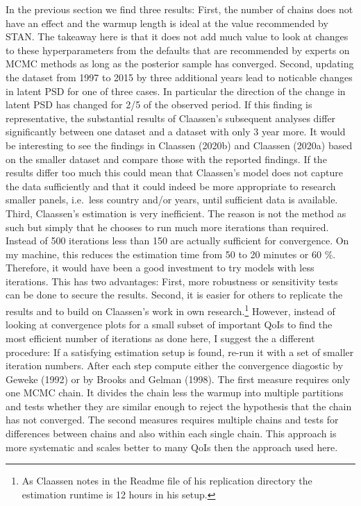 \documentclass[12pt,english,a4paper,oneside]{article}
\theoremstyle{definition}
\theoremstyle{definition}
\theoremstyle{definition}
\theoremstyle{definition}
\theoremstyle{remark}
\begin{document}
In the previous section we find three results: First, the number of chains does not have an effect and the warmup length is ideal at the value recommended by STAN. The takeaway here is that it does not add much value to look at changes to these hyperparameters from the defaults that are recommended by experts on MCMC methods as long as the posterior sample has converged. Second, updating the dataset from 1997 to 2015 by three additional years lead to noticable changes in latent PSD for one of three cases. In particular the direction of the change in latent PSD has changed for 2/5 of the observed period. If this finding is representative, the substantial results of Claassen's subsequent analyses differ significantly between one dataset and a dataset with only 3 year more. It would be interesting to see the findings in Claassen (2020b) and Claassen (2020a) based on the smaller dataset and compare those with the reported findings. If the results differ too much this could mean that Claassen's model does not capture the data sufficiently and that it could indeed be more appropriate to research smaller panels, i.e.~less country and/or years, until sufficient data is available. Third, Claassen's estimation is very inefficient. The reason is not the method as such but simply that he chooses to run much more iterations than required. Instead of 500 iterations less than 150 are actually sufficient for convergence. On my machine, this reduces the estimation time from 50 to 20 minutes or 60 \(\%\). Therefore, it would have been a good investment to try models with less iterations. This has two advantages: First, more robustness or sensitivity tests can be done to secure the results. Second, it is easier for others to replicate the results and to build on Claassen's work in own research.\footnote{As Claassen notes in the Readme file of his replication directory the estimation runtime is 12 hours in his setup.} However, instead of looking at convergence plots for a small subset of important QoIs to find the most efficient number of iterations as done here, I suggest the a different procedure: If a satisfying estimation setup is found, re-run it with a set of smaller iteration numbers. After each step compute either the convergence diagostic by Geweke (1992) or by Brooks and Gelman (1998). The first measure requires only one MCMC chain. It divides the chain less the warmup into multiple partitions and tests whether they are similar enough to reject the hypothesis that the chain has not converged. The second measures requires multiple chains and tests for differences between chains and also within each single chain. This approach is more systematic and scales better to many QoIs then the approach used here.
\end{document}
